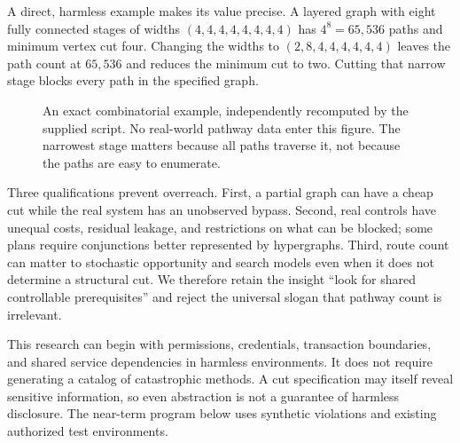 \documentclass[10pt,twocolumn,letterpaper]{article}
\begin{document}
A direct, harmless example makes its value precise. A layered graph with eight fully connected stages of widths $(4,4,4,4,4,4,4,4)$ has $4^8=65{,}536$ paths and minimum vertex cut four. Changing the widths to $(2,8,4,4,4,4,4,4)$ leaves the path count at $65{,}536$ and reduces the minimum cut to two. Cutting that narrow stage blocks every path in the specified graph.

\begin{figure}[t]
\centering
{}
\caption{An exact combinatorial example, independently recomputed by the supplied script. No real-world pathway data enter this figure. The narrowest stage matters because all paths traverse it, not because the paths are easy to enumerate.}
\label{fig:cuts}
\end{figure}

Three qualifications prevent overreach. First, a partial graph can have a cheap cut while the real system has an unobserved bypass. Second, real controls have unequal costs, residual leakage, and restrictions on what can be blocked; some plans require conjunctions better represented by hypergraphs. Third, route count can matter to stochastic opportunity and search models even when it does not determine a structural cut. We therefore retain the insight ``look for shared controllable prerequisites'' and reject the universal slogan that pathway count is irrelevant.

This research can begin with permissions, credentials, transaction boundaries, and shared service dependencies in harmless environments. It does not require generating a catalog of catastrophic methods. A cut specification may itself reveal sensitive information, so even abstraction is not a guarantee of harmless disclosure. The near-term program below uses synthetic violations and existing authorized test environments.
\end{document}

